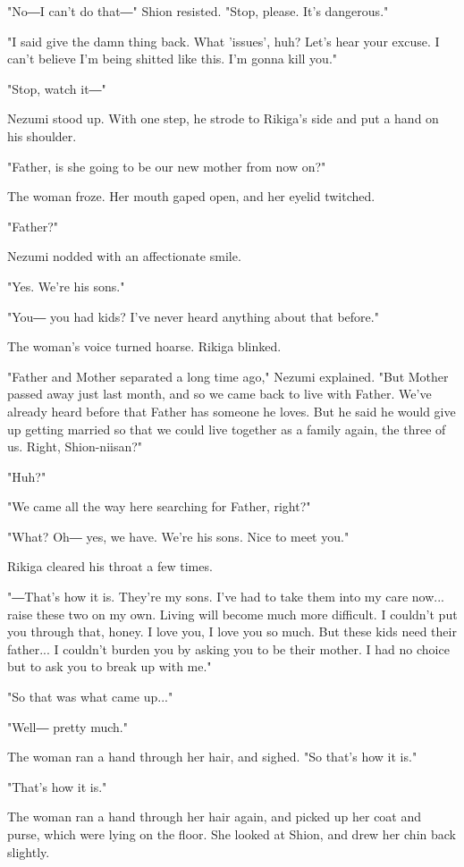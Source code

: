 "No―I can't do that―" Shion resisted. "Stop, please. It's dangerous."

"I said give the damn thing back. What 'issues', huh? Let's hear your
excuse. I can't believe I'm being shitted like this. I'm gonna kill
you."

"Stop, watch it―"

Nezumi stood up. With one step, he strode to Rikiga's side and put a
hand on his shoulder.

"Father, is she going to be our new mother from now on?"

The woman froze. Her mouth gaped open, and her eyelid twitched.

"Father?"

Nezumi nodded with an affectionate smile.

"Yes. We're his sons."

"You― you had kids? I've never heard anything about that before."

The woman's voice turned hoarse. Rikiga blinked.

"Father and Mother separated a long time ago," Nezumi explained. "But
Mother passed away just last month, and so we came back to live with
Father. We've already heard before that Father has someone he loves. But
he said he would give up getting married so that we could live together
as a family again, the three of us. Right, Shion-niisan?"

"Huh?"

"We came all the way here searching for Father, right?"

"What? Oh― yes, we have. We're his sons. Nice to meet you."

Rikiga cleared his throat a few times.

"―That's how it is. They're my sons. I've had to take them into my care
now... raise these two on my own. Living will become much more
difficult. I couldn't put you through that, honey. I love you, I love
you so much. But these kids need their father... I couldn't burden you
by asking you to be their mother. I had no choice but to ask you to
break up with me."

"So that was what came up..."

"Well― pretty much."

The woman ran a hand through her hair, and sighed. "So that's how it
is."

"That's how it is."

The woman ran a hand through her hair again, and picked up her coat and
purse, which were lying on the floor. She looked at Shion, and drew her
chin back slightly.

